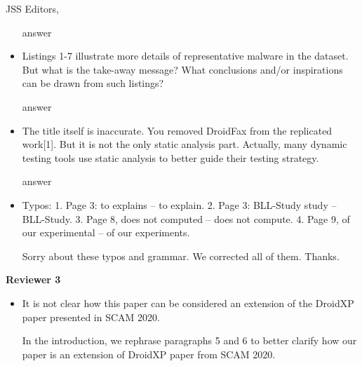 \documentclass{letter}
\begin{document}
\begin{letter}{JSS Editors,}
\begin{itemize}
\vspace{0.2cm}

{\color{blue}{\bf Answer:} answer}

\vspace{0.2cm}

\item Listings 1-7 illustrate more details of representative malware in the dataset. But what is the take-away message? What 
conclusions and/or inspirations can be drawn from such listings?


\vspace{0.2cm}

{\color{blue}{\bf Answer:} answer}

\vspace{0.2cm}

\item The title itself is inaccurate. You removed DroidFax from the replicated work[1]. But it is not the only static analysis part. 
Actually, many dynamic testing tools use static analysis to better guide their testing strategy.


\vspace{0.2cm}

{\color{blue}{\bf Answer:} answer}

\vspace{0.2cm}

\item Typos:
1. Page 3: to explains -- to explain.
2. Page 3: BLL-Study study -- BLL-Study.
3. Page 8, does not computed -- does not compute.
4. Page 9, of our experimental -- of our experiments.


\vspace{0.2cm}

{\color{blue}{\bf Answer:} Sorry about these typos and grammar. We corrected all of them. Thanks.}

\end{itemize}

{\bf Reviewer 3}

\begin{itemize}

\item It is not clear how this paper can be considered an extension of the DroidXP paper presented in SCAM 2020.


\vspace{0.2cm}

{\color{blue}{\bf Answer:} In the introduction, we rephrase paragraphs 5 and 6 to better clarify how our paper is an extension of DroidXP paper from SCAM 2020.}


\end{itemize}
\end{letter}
\end{document}
